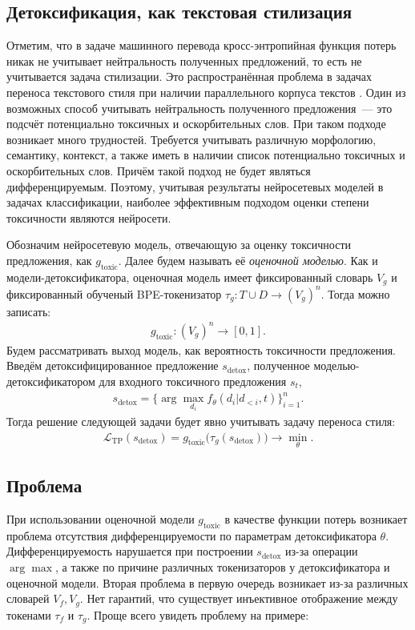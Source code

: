 \subsection{Детоксификация, как текстовая стилизация}
Отметим, что в задаче машинного перевода кросс-энтропийная функция потерь никак не учитывает нейтральность полученных предложений, то есть не учитывается задача стилизации.
Это распространённая проблема в задачах переноса текстового стиля при наличии параллельного корпуса текстов \cite{Tikhonov2018WhatIW}.
Один из возможных способ учитывать нейтральность полученного предложения~--- это подсчёт потенциально токсичных и оскорбительных слов. 
При таком подходе возникает много трудностей.
Требуется учитывать различную морфологию, семантику, контекст, а также иметь в наличии список потенциально токсичных и оскорбительных слов. 
Причём такой подход не будет являться дифференцируемым.
Поэтому, учитывая результаты нейросетевых моделей в задачах классификации, наиболее эффективным подходом оценки степени токсичности являются нейросети.

Обозначим нейросетевую модель, отвечающую за оценку токсичности предложения, как $g_{\text{toxic}}$.
Далее будем называть её \textit{оценочной моделью}.
Как и модели-детоксификатора, оценочная модель имеет фиксированный словарь $V_{g}$ и фиксированный обученый BPE-токенизатор $\tau_{g}: T \cup D \to \left(V_{g}\right)^{n}$.
Тогда можно записать: 
\begin{gather*}
    g_{\text{toxic}}:\left(V_{g}\right)^{n} \to [0, 1].
\end{gather*}
Будем рассматривать выход модель, как вероятность токсичности предложения. 
Введём детоксифицированное предложение $s_{\text{detox}}$, полученное моделью-детоксификатором для входного токсичного предложения $s_t$, 
\begin{gather*}
    s_{\text{detox}} = \{\arg\max_{d_i} f_{\theta}(d_{i} | d_{<i}, t)\}_{i=1}^{n}.
\end{gather*}
Тогда решение следующей задачи будет явно учитывать задачу переноса стиля: 
\begin{gather*}
    \mathcal{L}_{\text{TP}} (s_{\text{detox}}) = g_{\text{toxic}} \bigl(\tau_{g} (s_{\text{detox}}) \bigr) \longrightarrow \min_{\theta}.   
\end{gather*}

\subsection{Проблема}
\label{section:problem_statement}
При использовании оценочной модели $g_{\text{toxic}}$ в качестве функции потерь возникает проблема отсутствия дифференцируемости по параметрам детоксификатора $\theta$.
Дифференцируемость нарушается при построении $s_{\text{detox}}$ из-за операции $\arg\max$, а также по причине различных токенизаторов у детоксификатора и оценочной модели.
Вторая проблема в первую очередь возникает из-за различных словарей $V_{f}, V_{g}$.
Нет гарантий, что существует инъективное отображение между токенами $\tau_{f}$ и $\tau_{g}$. 
Проще всего увидеть проблему на примере: 


